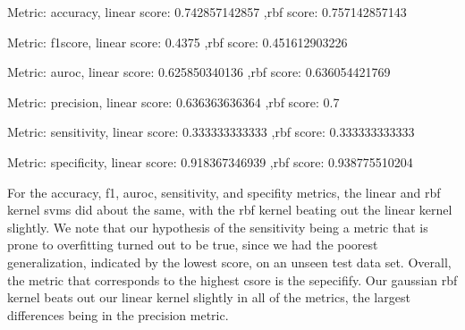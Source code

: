 \documentclass[11pt]{article}
\newcommand{\solution}[1]{{{\color{blue}{\bf Solution:} {#1}}}}
\begin{document}
\solution{
\newline{}

Metric: accuracy, linear score: 0.742857142857 ,rbf score: 0.757142857143

Metric: f1score, linear score: 0.4375 ,rbf score: 0.451612903226

Metric: auroc, linear score: 0.625850340136 ,rbf score: 0.636054421769

Metric: precision, linear score: 0.636363636364 ,rbf score: 0.7

Metric: sensitivity, linear score: 0.333333333333 ,rbf score: 0.333333333333

Metric: specificity, linear score: 0.918367346939 ,rbf score: 0.938775510204

For the accuracy, f1, auroc, sensitivity, and specifity metrics, the linear and rbf kernel svms did about the same, with the rbf kernel beating out the linear kernel slightly. We note that our hypothesis of the sensitivity being a metric that is prone to overfitting turned out to be true, since we had the poorest generalization, indicated by the lowest score, on an unseen test data set. Overall, the metric that corresponds to the highest csore is the sepecifify. Our gaussian rbf kernel beats out our linear kernel slightly in all of the metrics, the largest differences being in the precision metric. 
}
\end{document}
